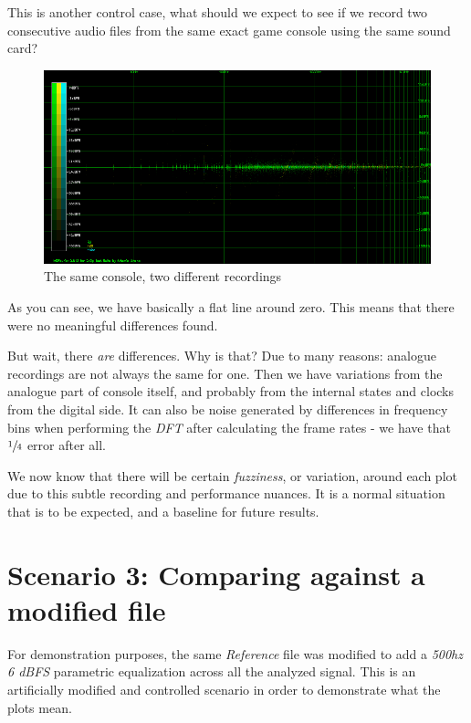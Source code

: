 \documentclass[10pt,a4paper]{report}
\begin{document}
This is another control case, what should we expect to see if we record two consecutive audio files from the same exact game console using the same sound card?

\begin{figure}[H]
	\centering
	\includegraphics[width=1\linewidth]{plots/Plot2-Sameconsole.png}
	\caption[Same console compared]{The same console, two different recordings}
	\label{fig:plot2-sameconsole}
\end{figure}

As you can see, we have basically a flat line around zero. This means that there were no meaningful differences found. 

But wait, there \textit{are} differences. Why is that? Due to many reasons: analogue recordings are not always the same for one. Then we have variations from the analogue part of console itself, and probably from the internal states and clocks from the digital side. It can also be noise generated by differences in frequency bins when performing the \textit{DFT} after calculating the frame rates - we have that $\sfrac{1}{4}$ error after all.

We now know that there will be certain \textit{fuzziness}, or variation, around each plot due to this subtle recording and performance nuances. It is a normal situation that is to be expected, and a baseline for future results.

\section{Scenario 3: Comparing against a modified file}

For demonstration purposes, the same \textit{Reference} file was modified to add a \textit{500hz 6 dBFS} parametric equalization across all the analyzed signal. This is an artificially modified and controlled scenario in order to demonstrate what the plots mean.
\end{document}
